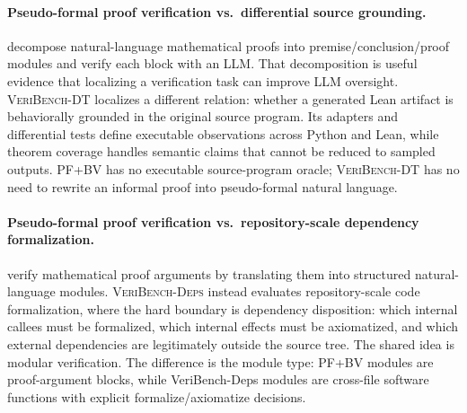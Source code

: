 \paragraph{Pseudo-formal proof verification vs.\ differential source grounding.}
\citet{barkallah2026pseudoformalization} decompose natural-language mathematical proofs into premise/conclusion/proof modules and verify each block with an LLM.
That decomposition is useful evidence that localizing a verification task can improve LLM oversight.
\textsc{VeriBench-DT} localizes a different relation: whether a generated Lean artifact is behaviorally grounded in the original source program.
Its adapters and differential tests define executable observations across Python and Lean, while theorem coverage handles semantic claims that cannot be reduced to sampled outputs.
PF+BV has no executable source-program oracle; \textsc{VeriBench-DT} has no need to rewrite an informal proof into pseudo-formal natural language.

\paragraph{Pseudo-formal proof verification vs.\ repository-scale dependency formalization.}
\citet{barkallah2026pseudoformalization} verify mathematical proof arguments by translating them into structured natural-language modules.
\textsc{VeriBench-Deps} instead evaluates repository-scale code formalization, where the hard boundary is dependency disposition: which internal callees must be formalized, which internal effects must be axiomatized, and which external dependencies are legitimately outside the source tree.
The shared idea is modular verification.
The difference is the module type: PF+BV modules are proof-argument blocks, while VeriBench-Deps modules are cross-file software functions with explicit formalize/axiomatize decisions.
